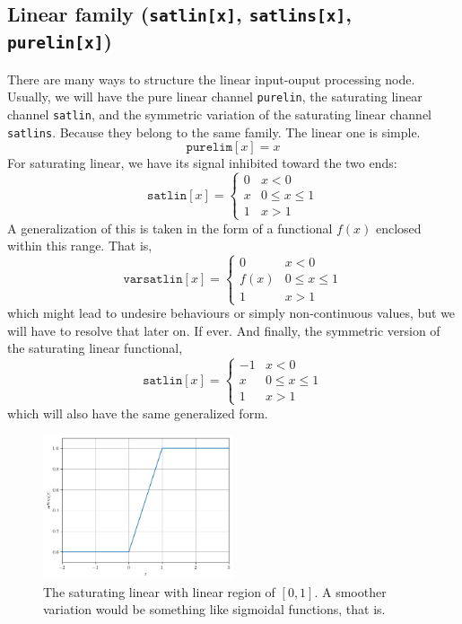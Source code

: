 \subsection{Linear family (\texttt{satlin[x]}, \texttt{satlins[x]}, \texttt{purelin[x]})}
There are many ways to structure the linear input-ouput processing node. Usually, we will have the pure linear channel \texttt{purelin}, the saturating linear channel \texttt{satlin}, and the symmetric variation of the saturating linear channel \texttt{satlins}. Because they belong to the same family. The linear one is simple.
\begin{equation}
    \texttt{purelim}[x] = x
\end{equation}
For saturating linear, we have its signal inhibited toward the two ends: 
\begin{equation}
    \texttt{satlin}[x] = \begin{cases}
        0 & x < 0\\
        x & 0 \leq x \leq 1\\
        1 & x > 1
    \end{cases}
\end{equation}
A generalization of this is taken in the form of a functional $f(x)$ enclosed within this range. That is, 
\begin{equation}
    \texttt{varsatlin}[x] = \begin{cases}
        0 & x < 0\\
        f(x) & 0 \leq x \leq 1\\
        1 & x > 1
    \end{cases}
\end{equation}
which might lead to undesire behaviours or simply non-continuous values, but we will have to resolve that later on. If ever. And finally, the symmetric version of the saturating linear functional, 
\begin{equation}
    \texttt{satlin}[x] = \begin{cases}
        -1 & x < 0\\
        x & 0 \leq x \leq 1\\
        1 & x > 1
    \end{cases}
\end{equation}
which will also have the same generalized form. 
\begin{figure}[h!]
    \centering
    \includegraphics[width=0.5\textwidth]{img/saturatinglin.png}
    \caption{The saturating linear with linear region of $[0,1]$. A smoother variation would be something like sigmoidal functions, that is.}
\end{figure}

